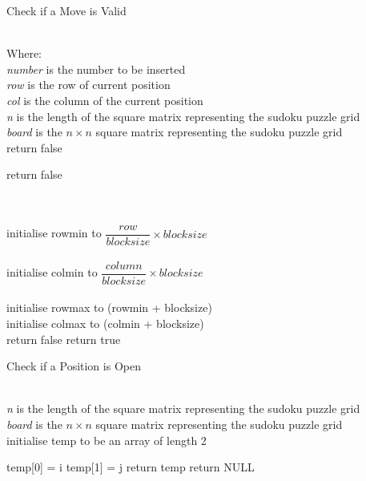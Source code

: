 \documentclass[12pt,a4paper,titlepage]{article}
\begin{document}
\begin{algorithm}[H]
\caption{Check if  a Move is Valid}
\begin{algorithmic}[1]

\\
Where:
\\
\textit{number} is the number to be inserted
\\
\textit{row} is the row of current position
\\
\textit{col} is the column of the current position
\\
\textit{n} is the length of the square matrix representing the sudoku puzzle grid 
\\
\textit{board} is the $n \times n$ square matrix representing the sudoku puzzle grid 
\\

			\State return false
		\EndIf
	\EndFor 	

			\State return false
		\EndIf
	\EndFor	
	
	
	\\
	\\
	initialise rowmin to $ \dfrac{row}{blocksize} \times blocksize $
	\\
	\\	
	initialise colmin to $ \dfrac{column}{blocksize} \times blocksize $
	\\
	\\		
	initialise rowmax to (rowmin + blocksize)
	\\		
	initialise colmax to (colmin + blocksize)	
	\\
	
	   			\State return false
	 		\EndIf       
  		\EndFor
  	\EndFor
	\State return true
\EndFunction
\end{algorithmic}
\end{algorithm}


\begin{algorithm}[H]
\caption{Check if a Position is Open}
\begin{algorithmic}[1]
\\
\textit{n} is the length of the square matrix representing the sudoku puzzle grid
\\
\textit{board} is the $n \times n$ square matrix representing the sudoku puzzle grid 
\\ 
\State initialise temp to be an array of length 2
  
				\State temp[0] = i
				\State temp[1] = j
				\State return temp 
			\EndIf       
		\EndFor
	\EndFor
	\State  return NULL
\EndFunction

\end{algorithmic}
\end{algorithm}
\end{document}
